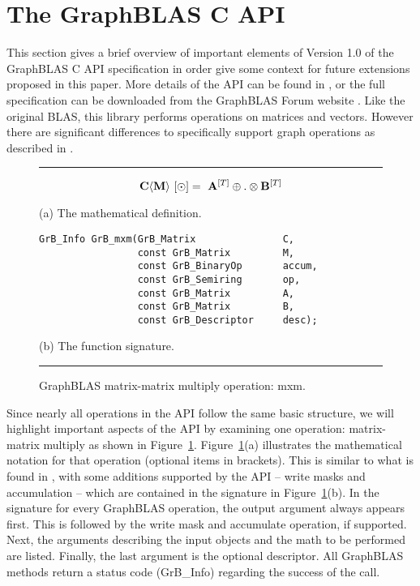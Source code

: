 %
%

\renewcommand{\vector}[1]{{\bf #1}}
\renewcommand{\matrix}[1]{{\bf #1}}

\section{The GraphBLAS C API}
\label{sec:GrBCspec}

This section gives a brief overview of important elements 
of Version 1.0 of the GraphBLAS C API specification in order give some context 
for future extensions proposed in this paper.  More details of the API can be 
found in \cite{graphblas_capi_17}, or the full specification can be downloaded 
from the GraphBLAS Forum website \cite{graphblas_web}.  Like the original BLAS, 
this library performs operations on matrices and vectors.  However there are 
significant differences to specifically support graph operations as described 
in \cite{mathgraphblas16}. 

\begin{figure}[b]
\hrule
\footnotesize
\[
\matrix{C}\langle \matrix{M} \rangle ~ [\odot] = ~ \matrix{A}^{[T]} \oplus.\otimes \matrix{B}^{[T]}
\]
\begin{center}(a) The mathematical definition.\end{center}

\begin{verbatim}
GrB_Info GrB_mxm(GrB_Matrix               C,
                 const GrB_Matrix         M,  
                 const GrB_BinaryOp       accum,
                 const GrB_Semiring       op,
                 const GrB_Matrix         A, 
                 const GrB_Matrix         B,
                 const GrB_Descriptor     desc);
\end{verbatim}
\begin{center}(b) The function signature.\end{center}
\caption{GraphBLAS matrix-matrix multiply operation: {\sf mxm}.\label{Fig:mxmfig}}
\hrule
\end{figure}

Since nearly all operations in the API follow the same basic structure, we will
highlight important aspects of the API by examining one operation: matrix-matrix
multiply as shown in Figure~\ref{Fig:mxmfig}.  Figure~\ref{Fig:mxmfig}(a) illustrates
the mathematical notation for that operation (optional items in brackets). This is similar to what is found in
\cite{mathgraphblas16}, with some additions supported by the API -- write masks and
accumulation -- which are contained in the signature in Figure~\ref{Fig:mxmfig}(b).
In the signature for every GraphBLAS operation, the output argument always 
appears first. This is followed by the write mask and accumulate operation, if supported. 
Next, the arguments describing the input objects and the math to be performed are
listed. Finally, the last argument is the optional descriptor.  All GraphBLAS methods
return a status code ({\sf GrB\_Info}) regarding the success of the call.

